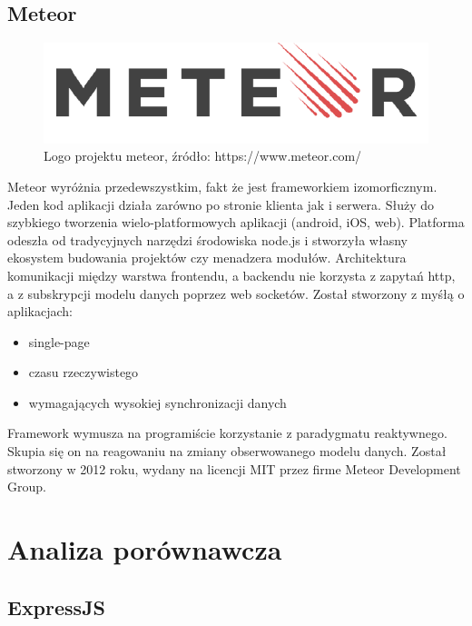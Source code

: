 \documentclass[12pt]{report}
\begin{document}
  \section{Meteor}
    \begin{figure}[!hb]
      \centering
      \includegraphics[width=\textwidth,height=\textheight,keepaspectratio]{logo_meteor.png} 
      \caption{Logo projektu meteor, źródło: https://www.meteor.com/}
    \end{figure}
    Meteor wyróżnia przedewszystkim, fakt że jest frameworkiem izomorficznym. 
    Jeden kod aplikacji działa zarówno po stronie klienta jak i serwera.
    Służy do szybkiego tworzenia wielo-platformowych aplikacji (android, iOS, web).
    Platforma odeszła od tradycyjnych narzędzi środowiska node.js i stworzyła własny ekosystem budowania projektów czy menadzera modułów.
    Architektura komunikacji między warstwa frontendu, a backendu nie korzysta z zapytań http, a z subskrypcji modelu danych poprzez web socketów.
    Został stworzony z myśłą o aplikacjach:
    \begin{itemize}
      \item single-page 
      \item czasu rzeczywistego
      \item wymagających wysokiej synchronizacji danych
    \end{itemize} 
    Framework wymusza na programiście korzystanie z paradygmatu reaktywnego.
    Skupia się on na reagowaniu na zmiany obserwowanego modelu danych.
    Został stworzony w 2012 roku, wydany na licencji MIT przez firme Meteor Development Group.

\chapter{Analiza porównawcza}
  \section{ExpressJS}
\end{document}
